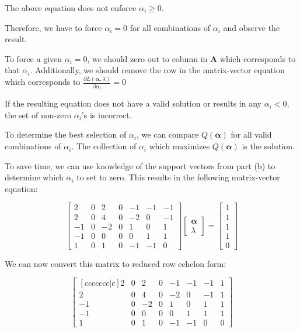 \documentclass[fleqn]{article}
\begin{document}
\begin{enumerate}
\begin{enumerate}
		The above equation does not enforce $\alpha_i \geq 0$.
		
		Therefore, we have to force $\alpha_i = 0$ for all combinations of $\alpha_i$ and observe the result.
		
		To force a given $\alpha_i = 0$, we should zero out to column in $\mathbf{A}$ which corresponds to that $\alpha_i$. Additionally, we should remove the row in the matrix-vector equation which corresponds to $\frac{\partial{L(\boldsymbol{\alpha},\lambda)}}{\partial\alpha_i} = 0$
		
		 If the resulting equation does not have a valid solution or results in any $\alpha_i < 0$, the set of non-zero $\alpha_i$'s is incorrect.
		 
		 To determine the best selection of $\alpha_i$, we can compare $Q(\boldsymbol{\alpha})$ for all valid combinations of $\alpha_i$. The collection of $\alpha_i$ which maximizes $Q(\boldsymbol{\alpha})$ is the solution.
		
		To save time, we can use knowledge of the support vectors from part (b) to determine which $\alpha_i$ to set to zero. This results in the following matrix-vector equation:
		
		\begin{equation*}
			\begin{bmatrix}
				 2 & 0 &  2 & 0 & -1 & -1 & -1 \\
             	 2 & 0 &  4 & 0 & -2 &  0 & -1 \\
            		-1 & 0 & -2 & 0 &  1 &  0 &  1 \\
               	-1 & 0 &  0 & 0 &  0 &  1 &  1 \\
                	 1 & 0 &  1 & 0 & -1 & -1 &  0
			\end{bmatrix}\begin{bmatrix}
				\boldsymbol{\alpha} \\ \lambda
			\end{bmatrix} = \begin{bmatrix}
				1 \\ 1 \\ 1 \\ 1 \\ 0
			\end{bmatrix}
		\end{equation*}
		
		We can now convert this matrix to reduced row echelon form:
		
		\begin{equation*}
			\begin{bmatrix}[ccccccc|c]
				 2 & 0 &  2 & 0 & -1 & -1 & -1 & 1\\
             	 2 & 0 &  4 & 0 & -2 &  0 & -1 & 1\\
            		-1 & 0 & -2 & 0 &  1 &  0 &  1 & 1\\
               	-1 & 0 &  0 & 0 &  0 &  1 &  1 & 1\\
                	 1 & 0 &  1 & 0 & -1 & -1 &  0 & 0
			\end{bmatrix}
		\end{equation*}
		

\end{enumerate}
\end{enumerate}
\end{document}
